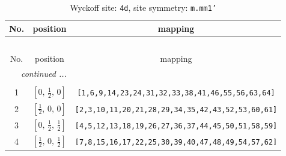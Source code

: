\documentclass[fleqn,8pt]{jsarticle}
\begin{document}
\renewcommand{\arraystretch}{1.2}
\begin{longtable}{ccc}
\caption{Wyckoff site: {\tt 4d}, site symmetry: {\tt m.mm1'}}
 \\
 \hline \hline
No. & position & mapping \\ \hline \endfirsthead

\multicolumn{2}{l}{\tablename\ \thetable{}} \\
 \hline \hline
No. & position & mapping \\ \hline \endhead

 \hline \hline
\multicolumn{2}{r}{\footnotesize\it continued ...} \\ \endfoot

 \hline \hline
\multicolumn{2}{r}{} \\ \endlastfoot

1 & $\left[ 0,\, \frac{1}{2},\, 0 \right]$ & {\tt [1,6,9,14,23,24,31,32,33,38,41,46,55,56,63,64]} \\ \hline
2 & $\left[ \frac{1}{2},\, 0,\, 0 \right]$ & {\tt [2,3,10,11,20,21,28,29,34,35,42,43,52,53,60,61]} \\ \hline
3 & $\left[ 0,\, \frac{1}{2},\, \frac{1}{2} \right]$ & {\tt [4,5,12,13,18,19,26,27,36,37,44,45,50,51,58,59]} \\ \hline
4 & $\left[ \frac{1}{2},\, 0,\, \frac{1}{2} \right]$ & {\tt [7,8,15,16,17,22,25,30,39,40,47,48,49,54,57,62]} \\
\end{longtable}
\renewcommand{\arraystretch}{1.2}
\end{document}
